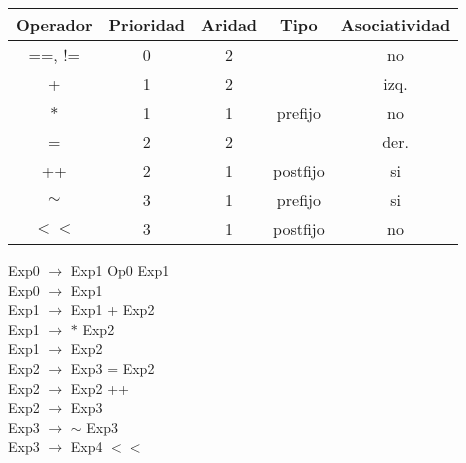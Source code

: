 \documentclass[\main/ApuntesPL.tex]{subfiles}
\begin{document}
      \begin{center}
        \begin{minipage}{.65\textwidth}
          \begin{tabular}{||c c c c c||}
            \hline
            Operador & Prioridad & Aridad & Tipo & Asociatividad \\ [0.5ex]
            \hline\hline
            ==, != & 0 & 2 &  & no \\
            \hline
            + & 1 & 2 &  & izq. \\
            \hline
            $\ast$ & 1 & 1 & prefijo & no \\
            \hline
            = & 2 & 2 &  & der. \\
            \hline
            ++ & 2 & 1 & postfijo & si \\
            \hline
            $\sim$ & 3 & 1 & prefijo & si \\
            \hline
            $<<$ & 3 & 1 & postfijo & no \\ [1ex]
            \hline
          \end{tabular}
        \end{minipage}%
        \begin{minipage}{.35\textwidth}
          \hspace*{10mm}Exp0 $\rightarrow$ Exp1 Op0 Exp1\\
          \hspace*{10mm}Exp0 $\rightarrow$ Exp1\\
          \hspace*{10mm}Exp1 $\rightarrow$ Exp1 + Exp2\\
          \hspace*{10mm}Exp1 $\rightarrow$ $\ast$ Exp2\\
          \hspace*{10mm}Exp1 $\rightarrow$ Exp2\\
          \hspace*{10mm}Exp2 $\rightarrow$ Exp3 = Exp2\\
          \hspace*{10mm}Exp2 $\rightarrow$ Exp2 ++\\
          \hspace*{10mm}Exp2 $\rightarrow$ Exp3\\
          \hspace*{10mm}Exp3 $\rightarrow$ $\sim$ Exp3\\
          \hspace*{10mm}Exp3 $\rightarrow$ Exp4 $<<$\\

\end{minipage}
\end{center}
\end{document}
